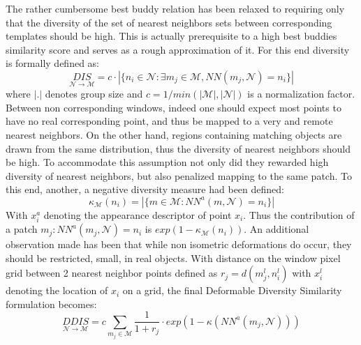 \documentclass[10pt,twocolumn,letterpaper]{article}
\begin{document}
The rather cumbersome best buddy relation has been relaxed to requiring only that the diversity of the set of nearest neighbors sets between corresponding templates should be high. This is actually prerequisite to a high best buddies similarity score and serves as a rough approximation of it. For this end diversity is formally defined as:
\begin{equation}
\underset{\mathcal{N}\rightarrow\mathcal{M}}{DIS}=c\cdot |\{n_i\in\mathcal{N}:\exists m_j\in\mathcal{M},NN(m_j,\mathcal{N})=n_i\}|
\end{equation}
where $|{.}|$ denotes group size and $c=1/min(|\mathcal{M}|,|\mathcal{N}|)$ is a normalization factor. Between non corresponding windows, indeed one should expect most points to have no real corresponding point, and thus be mapped to a very and remote nearest neighbors.  On the other hand, regions containing matching objects are drawn from the same distribution, thus the diversity of nearest neighbors should be high.
To accommodate this assumption not only did they rewarded high diversity of nearest neighbors, but also penalized mapping to the same patch. To this end, another, a negative diversity measure had been defined:
\begin{equation}
\kappa_{\mathcal{M}}(n_i)=|\{m\in\mathcal{M}:NN^a(m,\mathcal{N})=n_i\}|
\end{equation}
With $x_i^a$ denoting the appearance descriptor of point $x_i$.
Thus the contribution of a patch $m_j:NN^a(m_j,\mathcal{N})=n_i$ is $exp(1-\kappa_{\mathcal{M}}(n_i))$. 
An additional observation made has been that while non isometric deformations do occur, they should be restricted, small, in real objects. With  distance on the window pixel grid between 2 nearest neighbor points defined as $r_j=d(m_j^l,n_i^l)$ with $x_i^l$ denoting the location of $x_i$ on a grid, the final Deformable Diversity Similarity formulation becomes:
\begin{equation}
\underset{\mathcal{N}\rightarrow\mathcal{M}}{DDIS}=c\sum_{m_j\in\mathcal{M}} \frac{1}{1+r_j} \cdot exp(1-\kappa (NN^a(m_j,\mathcal{N})))
\end{equation}

\end{document}
